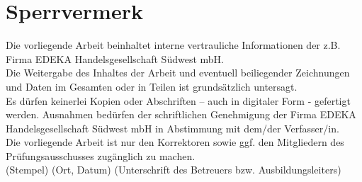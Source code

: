 \chapter*{Sperrvermerk}
Die vorliegende Arbeit beinhaltet interne vertrauliche Informationen 
der z.B. Firma EDEKA Handelsgesellschaft Südwest mbH.\\ 

\noindent Die Weitergabe des Inhaltes der Arbeit und eventuell beiliegender Zeichnungen und Daten im Gesamten oder in Teilen ist grundsätzlich untersagt.\\ 

\noindent Es dürfen keinerlei Kopien oder Abschriften – auch in digitaler Form - gefertigt werden. Ausnahmen bedürfen der schriftlichen Genehmigung der Firma EDEKA Handelsgesellschaft Südwest mbH in Abstimmung mit dem/der Verfasser/in.\\

\noindent Die vorliegende Arbeit ist nur den Korrektoren sowie ggf. den Mitgliedern des Prüfungsausschusses zugänglich zu machen. \\

\vspace*{2cm}
\noindent(Stempel)
\vspace*{1.5cm}\newline
\noindent(Ort, Datum)
\vspace*{1cm}\newline
\noindent(Unterschrift des Betreuers bzw. Ausbildungsleiters)
